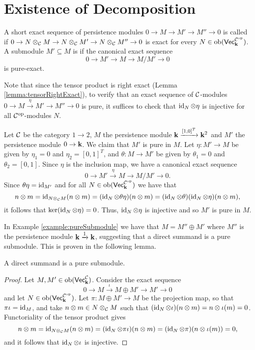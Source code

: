 \chapter{Existence of Decomposition}\label{chap:existence}
\begin{definition}
    A short exact sequence of persistence modules $0\to M\to M'\to M''\to 0$ is called  if $0\to N\otimes_{\mathcal{C}} M\to N\otimes_{\mathcal{C}} M'\to N\otimes_{\mathcal{C}} M''\to 0$ is exact for every $N\in\operatorname{ob}(\normalfont\mathsf{Vec}_{\mathbf{k}}^{\mathcal{C}^{\text{op}}})$.
    A submodule $M'\subseteq M$ is  if the canonical exact sequence
    \[ 0\to M'\to M\to M/M'\to 0 \]
    is pure-exact.
\end{definition}
Note that since the tensor product is right exact (Lemma \ref{lemma:tensorRightExact}), to verify that an exact sequence of $\mathcal{C}$-modules $0\to M\xrightarrow{\eta} M'\to M''\to 0$ is pure, it suffices to check that $\operatorname{id}_N\otimes\eta$ is injective for all $\mathcal{C}^{\text{op}}$-modules $N$.
\begin{example}\label{example:pureSubmodule}
    Let $\mathcal{C}$ be the category $1\to 2$, $M$ the persistence module $\mathbf{k}\xrightarrow{[1,0]^T}\mathbf{k}^2$ and $M'$ the persistence module $0\to\mathbf{k}$.
    We claim that $M'$ is pure in $M$.
    Let $\eta\colon M'\to M$ be given by $\eta_1=0$ and $\eta_2=[0,1]^T$, and $\theta\colon M\to M'$ be given by $\theta_1=0$ and $\theta_2=[0,1]$.
    Since $\eta$ is the inclusion map, we have a canonical exact sequence
    \[ 0\to M'\xrightarrow{\eta} M\to M/M'\to 0. \]
    Since $\theta\eta=\operatorname{id}_{M'}$ and for all $N\in\operatorname{ob}(\normalfont\mathsf{Vec}_{\mathbf{k}}^{\mathcal{C}^{\text{op}}})$ we have that
    \[ n\otimes m=\operatorname{id}_{N\otimes_{\mathcal{C}} M}(n\otimes m)=(\operatorname{id}_N\otimes\theta\eta)(n\otimes m)=(\operatorname{id}_N\otimes\theta)(\operatorname{id}_N\otimes\eta)(n\otimes m), \]
    it follows that $\ker(\operatorname{id}_N\otimes\eta)=0$.
    Thus, $\operatorname{id}_N\otimes\eta$ is injective and so $M'$ is pure in $M$.
\end{example}
In Example \ref{example:pureSubmodule} we have that $M=M''\oplus M'$ where $M''$ is the persistence module $\mathbf{k}\xrightarrow{1}\mathbf{k}$,
suggesting that a direct summand is a pure submodule. 
This is proven in the following lemma.
\begin{lemma}\label{lemma:directSumIsPure}
    A direct summand is a pure submodule.
\end{lemma}
\begin{proof}
    Let $M,M'\in\operatorname{ob}(\normalfont\mathsf{Vec}_{\mathbf{k}}^{\mathcal{C}})$. Consider the exact sequence
    \begin{equation}\label{eq:directSumExactSequence}
        0\to M\xrightarrow{\iota} M\oplus M'\to M'\to 0
    \end{equation}
    and let $N\in\operatorname{ob}(\normalfont\mathsf{Vec}_{\mathbf{k}}^{\mathcal{C}^{\text{op}}})$.
    Let $\pi\colon M\oplus M'\to M$ be the projection map, so that $\pi\iota=\operatorname{id}_M$, and take $n\otimes m\in N\otimes_{\mathcal{C}} M$ such that $(\operatorname{id}_N\otimes\iota)(n\otimes m)=n\otimes\iota(m)=0$.
    Functoriality of the tensor product gives
    \[n\otimes m=\operatorname{id}_{N\otimes_{\mathcal{C}} M}(n\otimes m)=(\operatorname{id}_N\otimes\pi\iota)(n\otimes m)=(\operatorname{id}_N\otimes\pi)(n\otimes \iota(m))=0, \]
    and it follows that $\operatorname{id}_N\otimes\iota$ is injective.
\end{proof}

